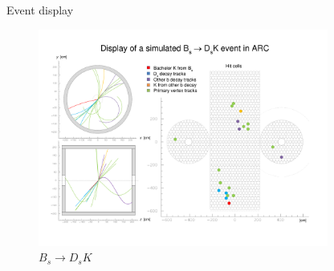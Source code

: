 \documentclass{beamer}
\begin{document}
\begin{frame}{Event display}
  \begin{figure}
    \centering
    \includegraphics[width = 0.85\textwidth, trim = {0cm 2cm 0cm 0cm}, clip = true]{Plots/Display2.pdf}
    \caption{$B_s\to D_sK$}
  \end{figure}
\end{frame}
\end{document}
